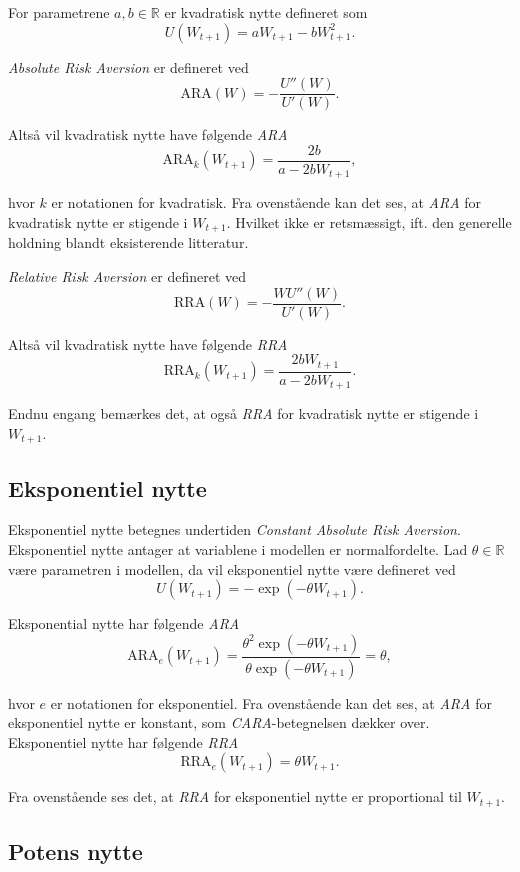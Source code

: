 \documentclass[
  a4paper,
  oneside]{memoir}
\begin{document}
For parametrene \(a,b\in\mathbb{R}\) er kvadratisk nytte defineret som
\begin{equation*}
U(W_{t+1})=aW_{t+1}-bW_{t+1}^2.
\end{equation*}

\emph{Absolute Risk Aversion} er defineret ved
\[\text{ARA}(W)=-\frac{U''(W)}{U'(W)}.\]

Altså vil kvadratisk nytte have følgende \emph{ARA}
\[\text{ARA}_k(W_{t+1})=\frac{2b}{a-2bW_{t+1}},\]

hvor \(k\) er notationen for kvadratisk. Fra ovenstående kan det ses, at \emph{ARA} for kvadratisk nytte er stigende i \(W_{t+1}\). Hvilket ikke er retsmæssigt, ift. den generelle holdning blandt eksisterende litteratur.

\emph{Relative Risk Aversion} er defineret ved
\[\text{RRA}(W)=-\frac{WU''(W)}{U'(W)}.\]

Altså vil kvadratisk nytte have følgende \emph{RRA}
\[\text{RRA}_k(W_{t+1})= \frac{2bW_{t+1}}{a-2bW_{t+1}}.\]

Endnu engang bemærkes det, at også \emph{RRA} for kvadratisk nytte er stigende i \(W_{t+1}\).

\hypertarget{eksponentiel-nytte-1}{%
\subsection{Eksponentiel nytte}\label{eksponentiel-nytte-1}}

Eksponentiel nytte betegnes undertiden \emph{Constant Absolute Risk Aversion}. Eksponentiel nytte antager at variablene i modellen er normalfordelte. Lad \(\theta\in\mathbb{R}\) være parametren i modellen, da vil eksponentiel nytte være defineret ved
\begin{equation*}
U(W_{t+1})=-\exp\left(-\theta W_{t+1}\right).
\end{equation*}

Eksponential nytte har følgende \emph{ARA}
\[\text{ARA}_e(W_{t+1})=\frac{\theta^2\exp\left(-\theta W_{t+1}\right)}{\theta\exp\left(-\theta W_{t+1}\right)}=\theta,\]

hvor \(e\) er notationen for eksponentiel. Fra ovenstående kan det ses, at \emph{ARA} for eksponentiel nytte er konstant, som \emph{CARA}-betegnelsen dækker over. Eksponentiel nytte har følgende \emph{RRA}
\[\text{RRA}_e(W_{t+1})= \theta W_{t+1}.\]

Fra ovenstående ses det, at \emph{RRA} for eksponentiel nytte er proportional til \(W_{t+1}\).

\hypertarget{potens-nytte-1}{%
\subsection{Potens nytte}\label{potens-nytte-1}}
\end{document}
